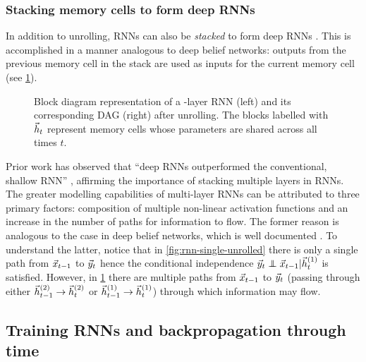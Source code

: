 \subsubsection{Stacking memory cells to form deep RNNs}

In addition to unrolling, RNNs can also be \emph{stacked} to form deep RNNs
\citep{el1995hierarchical,schmidhuber1992learning}. This is accomplished in a
manner analogous to deep belief networks: outputs from the previous memory cell
in the stack are used as inputs for the current memory cell (see
\cref{fig:rnn-multi-unrolled}).

\begin{figure}[tb]
    \centering
    \resizebox{4.5in}{!}{}
    \caption{Block diagram representation of a -layer RNN (left) and its
    corresponding DAG (right) after unrolling. The blocks labelled
    with $\vec{h}_t$ represent memory cells whose parameters are shared across all times
  $t$.}
    \label{fig:rnn-multi-unrolled}
\end{figure}

Prior work has observed that ``deep RNNs outperformed the conventional, shallow RNN''
\citet{pascanu2013construct}, affirming the importance of stacking multiple layers
in RNNs. The greater modelling capabilities of multi-layer RNNs can be
attributed to three primary factors: composition of multiple non-linear
activation functions and an increase in the number of paths for information to
flow. The former reason is analogous to the case in deep belief networks, which
is well documented \citep{bengio2009learning}. To understand the latter, notice
that in \cref{fig:rnn-single-unrolled} there is only a single path from
$\vec{x}_{t-1}$ to $\vec{y}_{t}$ hence the conditional independence $\y_{t} \independent
\x_{t-1} | \h^{(1)}_t$ is satisfied. However, in \cref{fig:rnn-multi-unrolled}
there are multiple paths from $\vec{x}_{t-1}$ to $\vec{y}_{t}$ (\eg passing through
either $\vec{h}^{(2)}_{t-1} \to \vec{h}^{(2)}_t$ or $\vec{h}^{(1)}_{t-1} \to \vec{h}^{(1)}_t$)
through which information may flow.


\subsection{Training RNNs and backpropagation through time}


